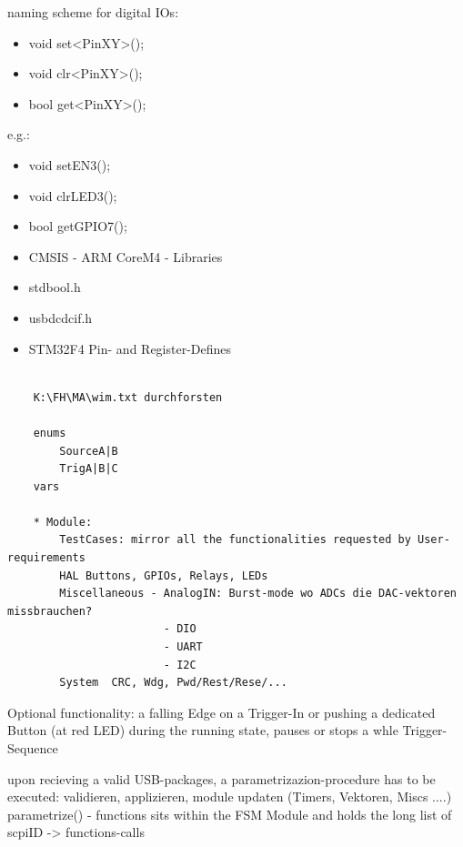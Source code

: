 	{	naming scheme for digital IOs:
		\begin{itemize} \setlength\itemsep{1px}
			\item void	set<PinXY>();
			\item void	clr<PinXY>();
			\item bool	get<PinXY>();
		\end{itemize}
		e.g.:
		\begin{itemize} \setlength\itemsep{1px}
		\item void	setEN3();
		\item void	clrLED3();
		\item bool	getGPIO7();
		\end{itemize}
	}

	{	\begin{itemize} \setlength\itemsep{1px}
		\item CMSIS - ARM CoreM4 - Libraries
		\item stdbool.h
		\item usbdcdcif.h
		\item STM32F4 Pin- and Register-Defines
		\end{itemize}
	}


\begin{verbatim}
	
	K:\FH\MA\wim.txt durchforsten
	
	enums
		SourceA|B
		TrigA|B|C
	vars
	
	* Module:
		TestCases: mirror all the functionalities requested by User-requirements
		HAL Buttons, GPIOs, Relays, LEDs
		Miscellaneous - AnalogIN: Burst-mode wo ADCs die DAC-vektoren missbrauchen?
						- DIO
						- UART
						- I2C
		System	CRC, Wdg, Pwd/Rest/Rese/...

\end{verbatim}
	{	
	}

	{	Optional functionality: a falling Edge on a Trigger-In or pushing a dedicated Button (at red LED) during the running state, pauses or stops a whle Trigger-Sequence
	}

	{	upon recieving a valid USB-packages, a parametrizazion-procedure has to be executed:
		validieren, applizieren, module updaten (Timers, Vektoren, Miscs ....)
		parametrize() - functions sits within the FSM Module and holds the long list of scpiID -> functions-calls
	}

